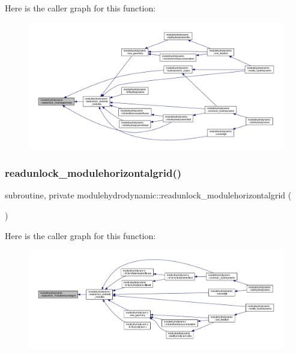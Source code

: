 Here is the caller graph for this function\+:\nopagebreak
\begin{figure}[H]
\begin{center}
\leavevmode
\includegraphics[width=350pt]{namespacemodulehydrodynamic_a987bae5d3ffa9f3fc96e0dfa2ead01ad_icgraph}
\end{center}
\end{figure}
\mbox{\label{namespacemodulehydrodynamic_aaf0ec07ca1129c3b8498e92e10e49f10}} 
\subsubsection{\texorpdfstring{readunlock\+\_\+modulehorizontalgrid()}{readunlock\_modulehorizontalgrid()}}
{\footnotesize\ttfamily subroutine, private modulehydrodynamic\+::readunlock\+\_\+modulehorizontalgrid (\begin{DoxyParamCaption}{ }\end{DoxyParamCaption})\hspace{0.3cm}{\ttfamily [private]}}

Here is the caller graph for this function\+:\nopagebreak
\begin{figure}[H]
\begin{center}
\leavevmode
\includegraphics[width=350pt]{namespacemodulehydrodynamic_aaf0ec07ca1129c3b8498e92e10e49f10_icgraph}
\end{center}
\end{figure}
\mbox{\label{namespacemodulehydrodynamic_af77f71622ac304600bd312437b8af339}} 
